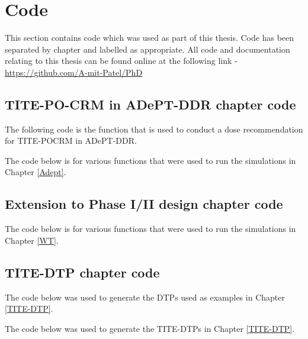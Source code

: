 
\chapter{Code} %

\label{AppendixCode} %

This section contains code which was used as part of this thesis. Code has been separated by chapter and labelled as appropriate. All code and documentation relating to this thesis can be found online at the following link - \href{https://github.com/A-mit-Patel/PhD}{https://github.com/A-mit-Patel/PhD}

\section{TITE-PO-CRM in ADePT-DDR chapter code}

The following code is the function that is used to conduct a dose recommendation for TITE-POCRM in ADePT-DDR.



The code below is for various functions that were used to run the simulations in Chapter \ref{Adept}. 



\section{Extension to Phase I/II design chapter code}

The code below is for various functions that were used to run the simulations in Chapter \ref{WT}. 



\section{TITE-DTP chapter code}

The code below was used to generate the DTPs used as examples in Chapter \ref{TITE-DTP}. 



The code below was used to generate the TITE-DTPs in Chapter \ref{TITE-DTP}.

